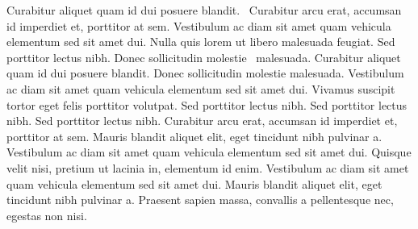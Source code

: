 \documentclass{article}
\begin{document}
Curabitur aliquet quam id dui posuere blandit. \hidenumberingonleftpage\ Curabitur arcu erat, accumsan id imperdiet et, porttitor at sem. Vestibulum ac diam sit amet quam vehicula elementum sed sit amet dui. Nulla quis lorem ut libero malesuada feugiat. Sed porttitor lectus nibh. Donec sollicitudin molestie \hidenumberingonrightpage\ malesuada. Curabitur aliquet quam id dui posuere blandit. Donec sollicitudin molestie malesuada. Vestibulum ac diam sit amet quam vehicula elementum sed sit amet dui. Vivamus suscipit tortor eget felis porttitor volutpat. Sed porttitor lectus nibh. Sed porttitor lectus nibh. Sed porttitor lectus nibh. Curabitur arcu erat, accumsan id imperdiet et, porttitor at sem. Mauris blandit aliquet elit, eget tincidunt nibh pulvinar a. Vestibulum ac diam sit amet quam vehicula elementum sed sit amet dui. Quisque velit nisi, pretium ut lacinia in, elementum id enim. Vestibulum ac diam sit amet quam vehicula elementum sed sit amet dui. Mauris blandit aliquet elit, eget tincidunt nibh pulvinar a. Praesent sapien massa, convallis a pellentesque nec, egestas non nisi.

\endnumbering
\end{document}
